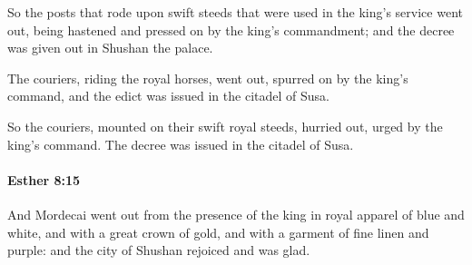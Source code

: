 			\begin{versebox}
					\item[BHS] 
					\item[LXX] 
					\item[ASV] So the posts that rode upon swift steeds that were used in the king's service went out, being hastened and pressed on by the king's commandment; and the decree was given out in Shushan the palace.
					\item[NIV] The couriers, riding the royal horses, went out, spurred on by the king’s command, and the edict was issued in the citadel of Susa.
					\item[NRSV] So the couriers, mounted on their swift royal steeds, hurried out, urged by the king’s command. The decree was issued in the citadel of Susa.
			\end{versebox}

		\paragraph{Esther 8:15} %
			\label{ESTHER-8-15}

			And Mordecai went out from the presence of the king in royal apparel of blue and white, and with a great crown of gold, and with a garment of fine linen and purple: and the city of Shushan rejoiced and was glad.

